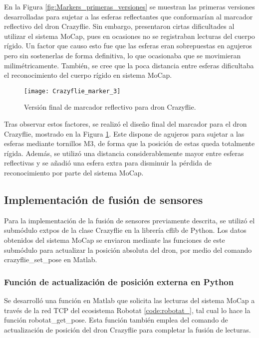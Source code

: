 En la Figura \ref{fig:Markers_primeras_versiones} se muestran las primeras versiones desarrolladas para sujetar a las esferas reflectantes que conformarían al marcador reflectivo del dron Crazyflie. Sin embargo, presentaron cirtas dificultades al utilizar el sistema MoCap, pues en ocasiones no se registraban lecturas del cuerpo rígido. Un factor que causo esto fue que las esferas eran sobrepuestas en agujeros pero sin sostenerlas de forma definitiva, lo que ocasionaba que se movimieran milimétricamente. También, se cree que la poca distancia entre esferas dificultaba el reconocimiento del cuerpo rígido en sistema MoCap.
\vspace{5mm}
\begin{figure}[htbp]
	\centering
	\texttt{[image: Crazyflie\_marker\_3]}
	\caption{Versión final de marcador reflectivo para dron Crazyflie.}
	\label{fig:Marker_version_final}
\end{figure} 

Tras observar estos factores, se realizó el diseño final del marcador para el dron Crazyflie, mostrado en la Figura \ref{fig:Marker_version_final}. Este dispone de agujeros para sujetar a las esferas mediante tornillos M3, de forma que la posición de estas queda totalmente rígida. Además, se utilizó una distancia considerablemente mayor entre esferas reflectivas y se añadió una esfera extra para disminuir la pérdida de reconocimiento por parte del sistema MoCap.


\subsection{Implementación de fusión de sensores}
Para la implementación de la fusión de sensores previamente descrita, se utilizó el submódulo extpos de la clase Crazyflie en la librería cflib de Python. Los datos obtenidos del sistema MoCap se enviaron mediante las funciones de este submódulo para actualizar la posición absoluta del dron, por medio del comando crazyflie\_set\_pose en Matlab. 

\subsubsection{Función de actualización de posición externa en Python}
Se desarrolló una función en Matlab que solicita las lecturas del sistema MoCap a través de la red TCP del ecosistema Robotat \ref{code:robotat_}, tal cual lo hace la función robotat\_get\_pose. Esta función también emplea del comando de actualización de posición del dron Crazyflie para completar la fusión de lecturas.

